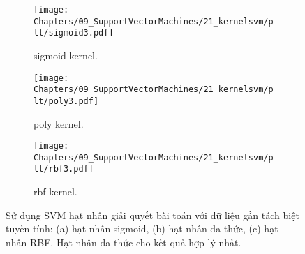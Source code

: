 \begin{figure}[t]
\begin{subfigure}{0.325\textwidth}
\texttt{[image: Chapters/09\_SupportVectorMachines/21\_kernelsvm/plt/sigmoid3.pdf]}
\caption{sigmoid kernel.}
\end{subfigure}
\begin{subfigure}{0.325\textwidth}
\texttt{[image: Chapters/09\_SupportVectorMachines/21\_kernelsvm/plt/poly3.pdf]}
\caption{poly kernel.}
\end{subfigure}
\begin{subfigure}{0.325\textwidth}
\texttt{[image: Chapters/09\_SupportVectorMachines/21\_kernelsvm/plt/rbf3.pdf]}
\caption{rbf kernel.}
\end{subfigure}

\caption{
Sử dụng SVM hạt nhân giải quyết bài toán với dữ liệu {gần tách biệt
tuyến tính}: (a) hạt nhân sigmoid, (b) hạt nhân đa thức, (c) hạt nhân RBF. Hạt nhân đa thức cho kết quả hợp lý nhất. }
\label{fig:21_3}
\end{figure}




